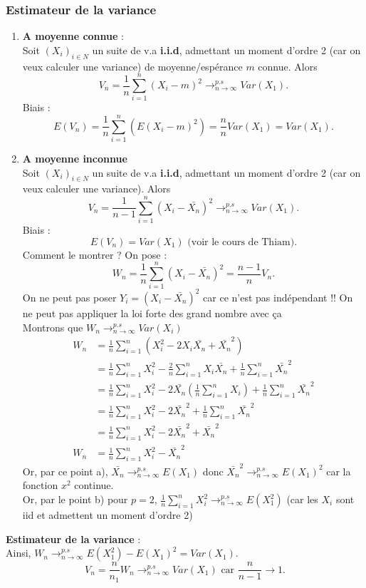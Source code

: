 \documentclass{article}
\theoremstyle{plain}%
\theoremstyle{definition}
\theoremstyle{remark}
\begin{document}
\subsubsection{Estimateur de la variance}
\begin{enumerate}
    \item \textbf{A moyenne connue} : \\
    Soit $ (X_i)_{i \in N} $ un suite de v.a \textbf{i.i.d}, admettant un moment d'ordre 2 (car on veux calculer une variance) de moyenne/espérance $ m $ connue. Alors 
    \[
        V_n =\frac{1}{n}\sum_{i=1}^{n}(X_i -m)^2 \to ^{p.s}_{n \to \infty } Var(X_1)
    .\]
    Biais : 
    \[
        E(V_n) = \frac{1}{n}\sum_{i=1}^{n}(E(X_i - m)^2) = \frac{n}{n} Var(X_1) = Var(X_1)
    .\]
    
    \item \textbf{A moyenne inconnue} \\
    Soit $ (X_i)_{i \in N} $ un suite de v.a \textbf{i.i.d}, admettant un moment d'ordre 2 (car on veux calculer une variance). Alors 
    \[
        V_n = \frac{1}{n-1}\sum_{i=1}^{n}(X_i - \bar{X_n})^2 \to ^{p.s}_{n \to \infty } Var(X_1)
    .\]
    Biais : 
    \[
        E(V_n) = Var(X_1) \text{ (voir le cours de Thiam)}
    .\]
    Comment le montrer ? On pose : 
    \[
        W_n = \frac{1}{n}\sum_{i=1}^{n}(X_i - \bar{X_n})^2 = \frac{n-1}{n}V_n
    .\]
    On ne peut pas poser $ Y_i = (X_i - \bar{X_n})^2 $ car ce n'est pas indépendant !! On ne peut pas appliquer la loi forte des grand nombre avec ça\\ 
    Montrons que $ W_n \to ^{p.s}_{n \to \infty } Var(X_i) $ 
    \begin{align*}
        W_n &= \frac{1}{n}\sum_{i=1}^{n}(X_i^2 - 2X_i \bar{X_n} + \bar{X_n}^2) \\
            &= \frac{1}{n}\sum_{i=1}^{n}X_i^2 - \frac{2}{n}\sum_{i=1}^{n} X_i \bar{X_n} + \frac{1}{n}\sum_{i=1}^{n}\bar{X_n}^2 \\
            &= \frac{1}{n}\sum_{i=1}^{n}X_i^2 - 2 \bar{X_n} (\frac{1}{n} \sum_{i=1}^{n} X_i) + \frac{1}{n}\sum_{i=1}^{n}\bar{X_n}^2 \\
            &= \frac{1}{n}\sum_{i=1}^{n}X_i^2- 2 \bar{X_n}^2 + \frac{1}{n}\sum_{i=1}^{n}\bar{X_n}^2 \\
            &= \frac{1}{n}\sum_{i=1}^{n}X_i^2- 2 \bar{X_n}^2 + \bar{X_n}^2 \\
        W_n &= \frac{1}{n}\sum_{i=1}^{n}X_i^2 - \bar{X_n}^2
    \end{align*}
    Or, par ce point a), $ \bar{X_n} \to ^{p.s}_{n \to \infty } E(X_1) $ donc $ \bar{X_n}^2 \to ^{p.s}_{n \to \infty } E(X_1)^2 $ car la fonction $ x^2 $ continue. \\ 
    Or, par le point b) pour $ p=2 $, $ \frac{1}{n}\sum_{i=1}^{n}X_i^2 \to ^{p.s}_{n \to \infty } E(X_1^2) $ (car les $X_i$ sont iid et admettent un moment d'ordre 2)
\end{enumerate}
\textbf{Estimateur de la variance } : \\
Ainsi, $ W_n \to ^{p.s}_{n \to \infty } E(X_1^2) - E(X_1)^2 = Var(X_1) $. 
\[
    V_n = \frac{n}{n_1}W_n \to ^{p.s}_{n \to \infty } Var(X_1) \text{ car } \frac{n}{n-1} \to 1
.\]
\end{document}
